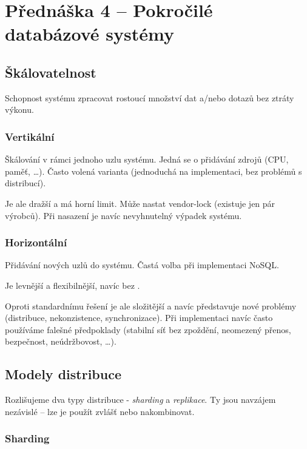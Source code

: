 \section{Přednáška 4 -- Pokročilé databázové systémy}

\subsection*{Škálovatelnost}

Schopnost systému zpracovat rostoucí množství dat a/nebo dotazů bez ztráty výkonu.

\subsubsection*{Vertikální}

Škálování v rámci jednoho uzlu systému.
Jedná se o přidávání zdrojů (CPU, paměť, \dots).
Často volená varianta (jednoduchá na implementaci, bez problémů s distribucí).

Je ale dražší a má horní limit.
Může nastat vendor-lock (existuje jen pár výrobců).
Při nasazení je navíc nevyhnutelný výpadek systému.

\subsubsection*{Horizontální}

Přidávání nových uzlů do systému.
Častá volba při implementaci NoSQL.

Je levnější a flexibilnější, navíc bez .

Oproti standardnímu řešení je ale složitější a navíc představuje nové problémy (distribuce, nekonzistence, synchronizace).
Při implementaci navíc často používáme falešné předpoklady (stabilní síť bez zpoždění, neomezený přenos, bezpečnost, neúdržbovost, \dots).

\subsection*{Modely distribuce}

Rozlišujeme dva typy distribuce - \textit{sharding} a \textit{replikace}.
Ty jsou navzájem nezávislé -- lze je použít zvlášť nebo nakombinovat.

\subsubsection*{Sharding}

